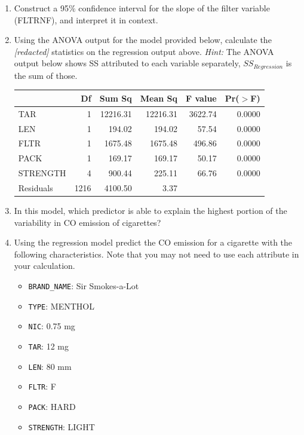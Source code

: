 \documentclass[11pt]{article}
\begin{document}
\begin{enumerate}[resume]

\item Construct a 95\% confidence interval for the slope of the filter variable (FLTRNF), and interpret it in context.

\item Using the ANOVA output for the model provided below, calculate the \textcolor{oiB}{\textit{[redacted]}} statistics on the regression output above. \textit{Hint:} The ANOVA output below shows SS attributed to each variable separately, $SS_{Regression}$ is the sum of those.

\begin{center}
\begin{tabular}{lrrrrr}
  \hline
 & Df & Sum Sq & Mean Sq & F value & Pr($>$F) \\ 
  \hline
TAR & 1 & 12216.31 & 12216.31 & 3622.74 & 0.0000 \\ 
  LEN & 1 & 194.02 & 194.02 & 57.54 & 0.0000 \\ 
  FLTR & 1 & 1675.48 & 1675.48 & 496.86 & 0.0000 \\ 
  PACK & 1 & 169.17 & 169.17 & 50.17 & 0.0000 \\ 
  STRENGTH & 4 & 900.44 & 225.11 & 66.76 & 0.0000 \\ 
  Residuals & 1216 & 4100.50 & 3.37 &  &  \\ 
   \hline
\end{tabular}
\end{center}

\item In this model, which predictor is able to explain the highest portion of the variability in CO emission of cigarettes?

\item Using the regression model predict the CO emission for a cigarette with the following characteristics. Note that you may not need to use each attribute in your calculation.

\begin{multicols}{2}
\begin{itemize}
\item \texttt{BRAND\_NAME}: Sir Smokes-a-Lot
\item \texttt{TYPE}: MENTHOL
\item \texttt{NIC}: 0.75 mg
\item \texttt{TAR}: 12 mg
\item \texttt{LEN}: 80 mm
\item \texttt{FLTR}: F
\item \texttt{PACK}: HARD
\item \texttt{STRENGTH}: LIGHT
\end{itemize}
\end{multicols}


\end{enumerate}
\end{document}
